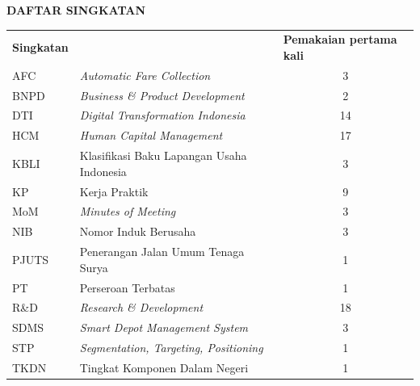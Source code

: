 \cleardoublepage
\vspace{2cm}
\begin{center}
{\fontsize{14}{16.8}\selectfont\textbf{DAFTAR SINGKATAN}}\\[1em]
\end{center}
\label{chap:singkatan}
\setcounter{chapter}{0}
\setcounter{section}{0}
\vspace{2em}




\begin{longtable}{@{} l >{\raggedright\arraybackslash}p{7.5cm} c @{}}
\multicolumn{1}{l}{\textbf{Singkatan}} & \multicolumn{1}{l}{\textbf{Deskripsi}} & \multicolumn{1}{l}{\parbox[c]{3.5cm}{\raggedright \textbf{Pemakaian pertama kali}}} \\


AFC & \textit{Automatic Fare Collection} & 3 \\
BNPD & \textit{Business \& Product Development} & 2 \\
DTI & \textit{Digital Transformation Indonesia} & 14 \\
HCM & \textit{Human Capital Management} & 17 \\
KBLI & Klasifikasi Baku Lapangan Usaha Indonesia & 3 \\
KP & Kerja Praktik & 9 \\
MoM & \textit{Minutes of Meeting} & 3 \\
NIB & Nomor Induk Berusaha & 3 \\
PJUTS & Penerangan Jalan Umum Tenaga Surya & 1 \\
PT & Perseroan Terbatas & 1 \\
R\&D & \textit{Research \& Development} & 18 \\
SDMS & \textit{Smart Depot Management System} & 3 \\
STP & \textit{Segmentation, Targeting, Positioning} & 1 \\
TKDN & Tingkat Komponen Dalam Negeri & 1 \\


\end{longtable}
